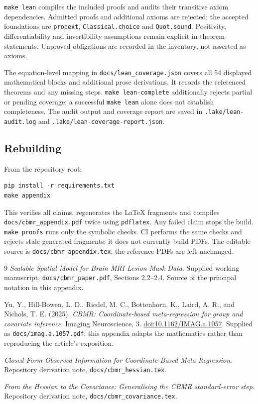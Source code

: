 \documentclass[11pt,a4paper]{article}
\numberwithin{equation}{section}
\begin{document}
\texttt{make lean} compiles the included proofs and audits their transitive
axiom dependencies. Admitted proofs and additional axioms are rejected;
the accepted foundations are \texttt{propext}, \texttt{Classical.choice}
and \texttt{Quot.sound}. Positivity, differentiability and invertibility
assumptions remain explicit in theorem statements. Unproved obligations
are recorded in the inventory, not asserted as axioms.

The equation-level mapping in \texttt{docs/lean\_coverage.json} covers
all 54 displayed mathematical blocks and additional prose derivations.
It records the referenced theorems and any missing steps.
\texttt{make lean-complete} additionally rejects partial or pending
coverage; a successful \texttt{make lean} alone does not establish completeness.
The audit output and coverage report are saved in
\texttt{.lake/lean-audit.log} and
\texttt{.lake/lean-coverage-report.json}.

\subsection{Rebuilding}
From the repository root:
\begin{verbatim}
pip install -r requirements.txt
make appendix
\end{verbatim}
This verifies all claims, regenerates the LaTeX fragments and compiles
\texttt{docs/cbmr\_appendix.pdf} twice using \texttt{pdflatex}.
Any failed claim stops the build. \texttt{make proofs} runs only the
symbolic checks. CI performs the same checks and rejects stale generated
fragments; it does not currently build PDFs.
The editable source is \texttt{docs/cbmr\_appendix.tex}; the reference PDFs
are left unchanged.

\clearpage
{}
{}
\begin{thebibliography}{9}
\emph{Scalable Spatial Model for Brain MRI Lesion Mask Data}.
Supplied working manuscript, \texttt{docs/cbmr\_paper.pdf},
Sections 2.2--2.4. Source of the principal notation in this appendix.

Yu, Y., Hill-Bowen, L. D., Riedel, M. C., Bottenhorn, K., Laird, A. R.,
and Nichols, T. E. (2025).
\emph{CBMR: Coordinate-based meta-regression for group and covariate inference}.
Imaging Neuroscience, 3.
\href{https://doi.org/10.1162/IMAG.a.1057}{doi:10.1162/IMAG.a.1057}.
Supplied as \texttt{docs/imag.a.1057.pdf}; this appendix adapts the
mathematics rather than reproducing the article's exposition.

\emph{Closed-Form Observed Information for Coordinate-Based Meta-Regression}.
Repository derivation note, \texttt{docs/cbmr\_hessian.tex}.

\emph{From the Hessian to the Covariance: Generalising the CBMR standard-error step}.
Repository derivation note, \texttt{docs/cbmr\_covariance.tex}.
\end{thebibliography}
\end{document}
